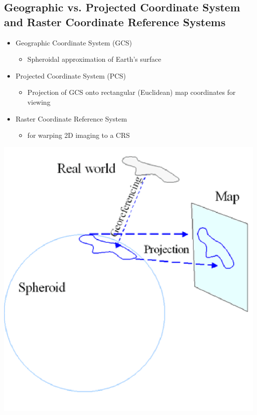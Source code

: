 \documentclass[11pt]{article}
\theoremstyle{definition}
\begin{document}
\subsection{Geographic vs. Projected
Coordinate System and Raster Coordinate Reference Systems}
\begin{itemize}
    \item Geographic Coordinate
    System (GCS)
    \begin{itemize}
        \item Spheroidal
        approximation of Earth’s
        surface
    \end{itemize}
    \item Projected Coordinate
    System (PCS)
    \begin{itemize}
        \item Projection of GCS onto
        rectangular (Euclidean)
        map coordinates for
        viewing
    \end{itemize}
    \item Raster Coordinate Reference System
    \begin{itemize}
        \item for warping 2D imaging to a CRS
    \end{itemize}
\end{itemize}

\includegraphics[width=\textwidth/4]{8.png}
\end{document}
